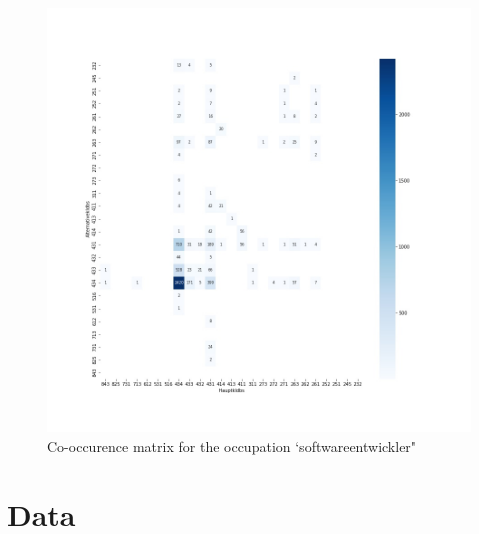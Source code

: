 \documentclass[12pt, a4paper, titlepage]{article}
\begin{document}
\begin{figure}[hb!]
  \center
  \includegraphics[scale=0.5]{co_occurence_softwareentwickler.jpg}
  \caption{\label{fig: F28} Co-occurence matrix for the occupation `softwareentwickler"}
\end{figure}



\clearpage







\newpage
\appendix
\section{Data}
\end{document}
